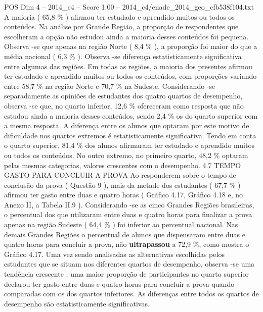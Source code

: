 \begin{textsample}{POS Dim 4 – 2014\_c4 – Score 1.00 – 2014\_c4/enade\_2014\_geo\_cfb538f104.txt}
A maioria ( 65,8 \% ) afirmou ter estudado e aprendido muitos ou todos os conteúdos.
Na análise por Grande Região, a proporção de respondentes que escolheram a opção não estudou ainda a maioria desses conteúdos foi pequena.
Observa -se que apenas na região Norte ( 8,4 \% ), a proporção foi maior do que a média nacional ( 6,3 \% ).
Observa -se diferença estatisticamente significativa entre algumas das regiões.
Em todas as regiões, a maioria dos presentes afirmou ter estudado e aprendido muitos ou todos os conteúdos, com proporções variando entre 58,7 \% na região Norte e 70,7 \% na Sudeste.
Considerando -se separadamente as opiniões de estudantes dos quatro quartos de desempenho, observa -se que, no quarto inferior, 12,6 \% ofereceram como resposta que não estudou ainda a maioria desses conteúdos, sendo 2,4 \% os do quarto superior com a mesma resposta.
A diferença entre os alunos que optaram por este motivo de dificuldade nos quartos extremos é estatisticamente significativa.
Tendo em conta o quarto superior, 81,4 \% dos alunos afirmaram ter estudado e aprendido muitos ou todos os conteúdos.
No outro extremo, no primeiro quarto, 48,2 \% optaram pelas mesmas categorias, valores crescentes com o desempenho. 4.7 TEMPO GASTO PARA CONCLUIR A PROVA Ao responderem sobre o tempo de conclusão da prova ( Questão 9 ), mais da metade dos estudantes ( 67,7 \% ) afirmou ter gasto entre duas e quatro horas ( Gráfico 4.17, Gráfico 4.18 e, no Anexo II, a Tabela II.9 ).
Considerando -se as cinco Grandes Regiões brasileiras, o percentual dos que utilizaram entre duas e quatro horas para finalizar a prova apenas na região Sudeste ( 64,4 \% ) foi inferior ao percentual nacional.
Nas demais Grandes Regiões o percentual de alunos que dispensaram entre duas e quatro horas para concluir a prova, não \textbf{ultrapassou} a 72,9 \%, como mostra o Gráfico 4.17.
Uma vez sendo analisadas as alternativas escolhidas pelos estudantes que se situam nos diferentes quartos de desempenho, observa -se uma tendência crescente : uma maior proporção de participantes no quarto superior declarou ter gasto entre duas e quatro horas para concluir a prova quando comparadas com os dos quartos inferiores.
As diferenças entre todos os quartos de desempenho são estatisticamente significativas.

\end{textsample}
